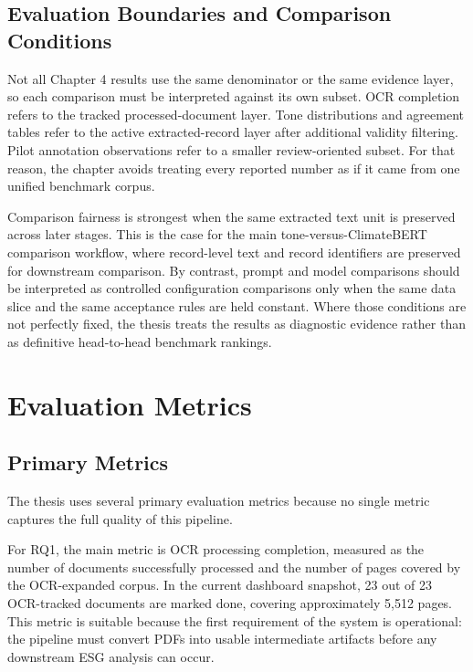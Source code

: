 \subsection{Evaluation Boundaries and Comparison Conditions}

Not all Chapter 4 results use the same denominator or the same evidence layer, so each comparison must be interpreted against its own subset. OCR completion refers to the tracked processed-document layer. Tone distributions and agreement tables refer to the active extracted-record layer after additional validity filtering. Pilot annotation observations refer to a smaller review-oriented subset. For that reason, the chapter avoids treating every reported number as if it came from one unified benchmark corpus.

Comparison fairness is strongest when the same extracted text unit is preserved across later stages. This is the case for the main tone-versus-ClimateBERT comparison workflow, where record-level text and record identifiers are preserved for downstream comparison. By contrast, prompt and model comparisons should be interpreted as controlled configuration comparisons only when the same data slice and the same acceptance rules are held constant. Where those conditions are not perfectly fixed, the thesis treats the results as diagnostic evidence rather than as definitive head-to-head benchmark rankings.

\section{Evaluation Metrics}

\subsection{Primary Metrics}

The thesis uses several primary evaluation metrics because no single metric captures the full quality of this pipeline.

For RQ1, the main metric is OCR processing completion, measured as the number of documents successfully processed and the number of pages covered by the OCR-expanded corpus. In the current dashboard snapshot, 23 out of 23 OCR-tracked documents are marked done, covering approximately 5,512 pages. This metric is suitable because the first requirement of the system is operational: the pipeline must convert PDFs into usable intermediate artifacts before any downstream ESG analysis can occur.

